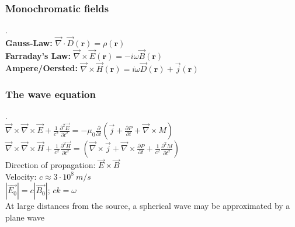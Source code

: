 \documentclass[9pt]{article}
\providecommand{\E}{\vec{E}}
\providecommand{\B}{\vec{B}}
\providecommand{\B}{\vec{B}}
\providecommand{\nv}{\vec{\nabla}}
\begin{document}
\begin{multicols}{2}
\subsubsection{Monochromatic fields}.\\
\textbf{Gauss-Law: }
					$\vec{\nabla} \cdot \vec{D}(\textbf{r})=\rho(\textbf{r})$\\
					\textbf{Farraday's Law: }
					$\vec{\nabla} \times \vec{E} (\textbf{r})= -i \omega \vec{B}(\textbf{r}) $\\
					\textbf{Ampere/Oersted:  }
					$\vec{\nabla} \times \vec{H} (\textbf{r}) = i\omega \vec{D}(\textbf{r})+\vec{j}(\textbf{r}) $
\subsubsection{The wave equation}.\\
	$\nv \times \nv \times \E + \frac{1}{c^{2}}\frac{\partial^{2}\E}{\partial t^{2}} = -\mu_{0} \frac{\partial}{\partial t }(\vec{j}+ \frac{\partial P}{\partial t}+ \nv \times M)$\\
					$\nv \times \nv \times \vec{H} + \frac{1}{c^{2}}\frac{\partial^{2}\vec{H}}{\partial t^{2}} = (\nv  \times \vec{j}+ \nv \times \frac{\partial P}{\partial t}+ \frac{1}{c^{2}} \frac{\partial^{2} M}{\partial t^{2}}) $\\
Direction of propagation: $\E \times \B$\\
Velocity: $c \approx 3\cdot 10^8\ m/s$\\
$|\vec{E_0}|=c|\vec{B_0}|$; $ck=\omega$\\
At large distances from the source, a spherical wave may be approximated by a plane wave

\end{multicols}
\end{document}
